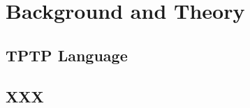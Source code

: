 
\chapter{Background and Theory}\label{cha:Background}
\section{TPTP Language}\label{sec:BackgroundTPTP}

\section{XXX}\label{sec:Websockets}
